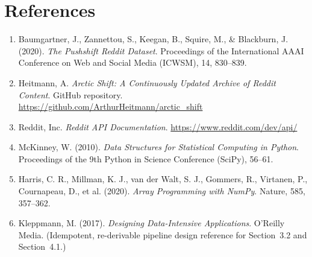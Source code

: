 \documentclass[12pt]{article}
\begin{document}
\section{References}

\begin{enumerate}
    \item Baumgartner, J., Zannettou, S., Keegan, B., Squire, M., \& Blackburn, J. (2020).
    \textit{The Pushshift Reddit Dataset}. Proceedings of the International AAAI Conference on
    Web and Social Media (ICWSM), 14, 830--839.

    \item Heitmann, A. \textit{Arctic Shift: A Continuously Updated Archive of Reddit Content}.
    GitHub repository. \url{https://github.com/ArthurHeitmann/arctic_shift}

    \item Reddit, Inc. \textit{Reddit API Documentation}. \url{https://www.reddit.com/dev/api/}

    \item McKinney, W. (2010). \textit{Data Structures for Statistical Computing in Python}.
    Proceedings of the 9th Python in Science Conference (SciPy), 56--61.

    \item Harris, C. R., Millman, K. J., van der Walt, S. J., Gommers, R., Virtanen, P.,
    Cournapeau, D., et al. (2020). \textit{Array Programming with NumPy}. Nature, 585,
    357--362.

    \item Kleppmann, M. (2017). \textit{Designing Data-Intensive Applications}. O'Reilly Media.
    (Idempotent, re-derivable pipeline design reference for Section~3.2 and Section~4.1.)
\end{enumerate}
\end{document}
